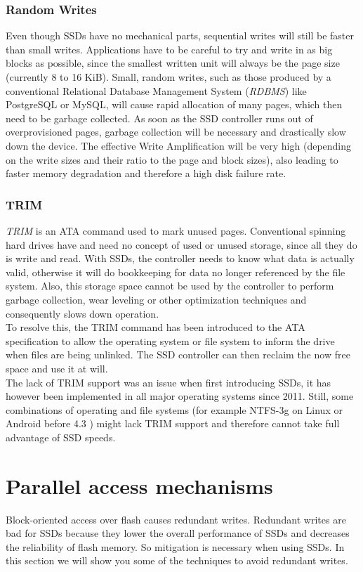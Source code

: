 \documentclass{acm_proc_article-sp}
\begin{document}
\subsubsection*{Random Writes}
Even though SSDs have no mechanical parts, sequential writes will still be faster than small writes. Applications have to be careful to try and write in as big blocks as possible, since the smallest written unit will always be the page size (currently 8 to 16 KiB). Small, random writes, such as those produced by a conventional Relational Database Management System (\emph{RDBMS}) like PostgreSQL or MySQL, will cause rapid allocation of many pages, which then need to be garbage collected. As soon as the SSD controller runs out of overprovisioned pages, garbage collection will be necessary and drastically slow down the device. The effective Write Amplification will be very high (depending on the write sizes and their ratio to the page and block sizes), also leading to faster memory degradation and therefore a high disk failure rate.

\subsubsection*{TRIM}
\emph{TRIM} is an ATA command used to mark unused pages. Conventional spinning hard drives have and need no concept of used or unused storage, since all they do is write and read. With SSDs, the controller needs to know what data is actually valid, otherwise it will do bookkeeping for data no longer referenced by the file system. Also, this storage space cannot be used by the controller to perform garbage collection, wear leveling or other optimization techniques and consequently slows down operation.
\\
To resolve this, the TRIM command has been introduced to the ATA specification to allow the operating system or file system to inform the drive when files are being unlinked. The SSD controller can then reclaim the now free space and use it at will.
\\
The lack of TRIM support was an issue when first introducing SSDs, it has however been implemented in all major operating systems since 2011. Still, some combinations of operating and file systems (for example NTFS-3g on Linux or Android before 4.3 \cite{androidtrim}) might lack TRIM support and therefore cannot take full advantage of SSD speeds.

\section{Parallel access mechanisms}
Block-oriented access over flash causes redundant writes. Redundant writes are bad for SSDs because they lower the overall performance of SSDs and decreases the reliability of flash memory. So mitigation is necessary when using SSDs. In this section we will show you some of the techniques to avoid redundant writes.
\end{document}
